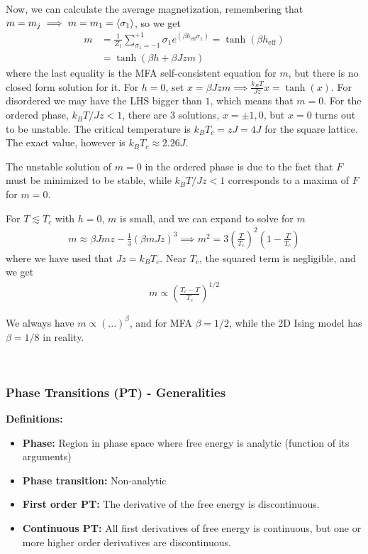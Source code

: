 \documentclass[a4paper, english, 12pt]{article}
\newcommand{\closed}[1]{\left( #1 \right)}
\begin{document}
\begin{multicols*}{2}
Now, we can calculate the average magnetization, remembering that $m=m_j\implies m=m_1=\expval{\sigma_1}$, so we get 
\begin{align*}
    m &= \frac{1}{Z_1} \sum_{\sigma_1=-1}^{+1} \sigma_1 e^{(\beta h_{\mathrm{eff}}\sigma_1)} = \tanh(\beta h_{\mathrm{eff}}) \\ 
    &= \tanh(\beta h + \beta Jzm)
\end{align*}
where the last equality is the MFA self-consistent equation for $m$, but there is no closed form solution for it. For $h=0$, set $x=\beta J zm\implies \frac{k_B T}{Jz}x=\tanh(x)$. For disordered we may have the LHS bigger than $1$, which means that $m=0$. For the ordered phase, $k_B T/Jz < 1$, there are $3$ solutions, $x=\pm1,0$, but $x=0$ turns out to be unstable. The critical temperature is $k_B T_c=zJ=4J$ for the square lattice. The exact value, however is $k_B T_c\approx 2.26 J$.   

The unstable solution of $m=0$ in the ordered phase is due to the fact that $F$ must be minimized to be stable, while $k_B T/Jz < 1$ corresponds to a maxima of $F$ for $m=0$.  


For $T\lesssim T_c$ with $h=0$, $m$ is small, and we can expand to solve for $m$
\begin{align*}
    m \approx \beta J m z - \frac{1}{3} (\beta m J z)^3 \implies m^2 = 3 \closed{\frac{T}{T_c}}^2 \closed{1-\frac{T}{T_c}} 
\end{align*}
where we have used that $Jz=k_B T_c$. Near $T_c$, the squared term is negligible, and we get 
\begin{align*}
    m \propto \closed{\frac{T_c-T}{T_c}}^{1/2}
\end{align*}

We always have $m\propto(...)^{\beta}$, and for MFA $\beta=1/2$, while the 2D Ising model has $\beta=1/8$ in reality. 

\


\subsubsection*{\scriptsize Phase Transitions (PT) - Generalities}
\textbf{Definitions:}
\begin{itemize}
    \item \textbf{Phase:} Region in phase space where free energy is analytic (function of its arguments)
    \item \textbf{Phase transition:} Non-analytic
    \item \textbf{First order PT:} The derivative of the free energy is discontinuous. 
    \item \textbf{Continuous PT:} All first derivatives of free energy is continuous, but one or more higher order derivatives are discontinuous. 
\end{itemize}


\end{multicols*}
\end{document}
